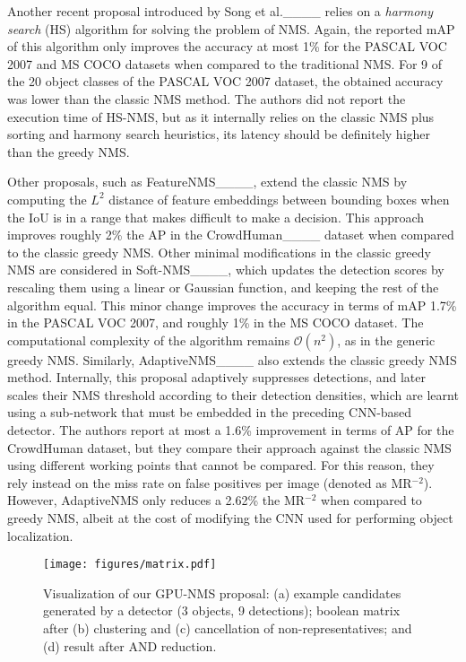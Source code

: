 Another recent proposal introduced by Song et al.____ relies on a \emph{harmony search} (HS) algorithm for solving the problem of NMS. Again, the reported 
mAP of this algorithm only improves the accuracy at most 1\% for the PASCAL VOC 2007 and MS COCO datasets when compared to the traditional NMS. For 9 of the 20 object classes of 
the PASCAL VOC 2007 dataset, the obtained accuracy was lower than the classic NMS method. The authors did not report the execution time of HS-NMS, but as it internally relies 
on the classic NMS plus sorting and harmony search heuristics, its latency should be definitely higher than the greedy NMS.

Other proposals, such as FeatureNMS____, extend the classic NMS by computing the $L^{2}$ distance of feature embeddings between bounding boxes 
when the IoU is in a range that makes difficult to make a decision. This approach improves roughly 2\% the AP in the CrowdHuman____ dataset when compared 
to the classic greedy NMS. Other minimal modifications in the classic greedy NMS are considered in Soft-NMS____, which updates the detection scores by rescaling 
them using a linear or Gaussian function, and keeping the rest of the algorithm equal. This minor change improves the accuracy in terms of mAP 1.7\% in the PASCAL VOC 2007, and 
roughly 1\% in the MS COCO dataset. The computational complexity of the algorithm remains $\mathcal{O}(n^{2})$, as in the generic greedy NMS. Similarly, AdaptiveNMS____ 
also extends the classic greedy NMS method. Internally, this proposal adaptively suppresses detections, and later scales their NMS threshold according to their detection densities, 
which are learnt using a sub-network that must be embedded in the preceding CNN-based detector. The authors report at most a 1.6\% improvement in terms of AP for the CrowdHuman 
dataset, but they compare their approach against the classic NMS using different working points that cannot be compared. For this reason, they rely instead on the miss rate on 
false positives per image (denoted as MR$^{-2}$). However, AdaptiveNMS only reduces a 2.62\% the MR$^{-2}$ when compared to greedy NMS, albeit at the cost of modifying the CNN 
used for performing object localization.

\begin{figure}[t]
\centering
\texttt{[image: figures/matrix.pdf]}
\caption{\label{fig:mapkernel} Visualization of our GPU-NMS proposal: 
(a) example candidates generated by a detector (3 objects, 9 detections); 
boolean matrix after (b) clustering and (c) cancellation of 
non-representatives; and (d) result after AND reduction.}
\end{figure}


